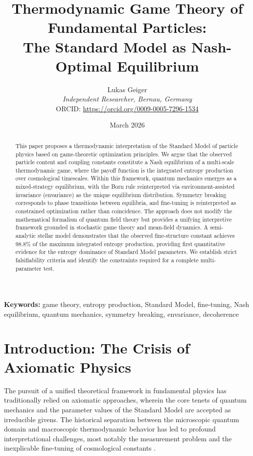 \documentclass[12pt,a4paper]{article}
\title{Thermodynamic Game Theory of Fundamental Particles:\\
The Standard Model as Nash-Optimal Equilibrium}
\author{Lukas Geiger\\
\textit{Independent Researcher, Bernau, Germany}\\
ORCID: \url{https://orcid.org/0009-0005-7296-1534}}
\date{March 2026}
\theoremstyle{remark}
\begin{document}
\maketitle

\begin{abstract}
This paper proposes a thermodynamic interpretation of the Standard Model of particle physics based on game-theoretic optimization principles. We argue that the observed particle content and coupling constants constitute a Nash equilibrium of a multi-scale thermodynamic game, where the payoff function is the integrated entropy production over cosmological timescales. Within this framework, quantum mechanics emerges as a mixed-strategy equilibrium, with the Born rule reinterpreted via environment-assisted invariance (envariance) as the unique equilibrium distribution. Symmetry breaking corresponds to phase transitions between equilibria, and fine-tuning is reinterpreted as constrained optimization rather than coincidence. The approach does not modify the mathematical formalism of quantum field theory but provides a unifying interpretive framework grounded in stochastic game theory and mean-field dynamics. A semi-analytic stellar model demonstrates that the observed fine-structure constant achieves 98.8\% of the maximum integrated entropy production, providing first quantitative evidence for the entropy dominance of Standard Model parameters. We establish strict falsifiability criteria and identify the constraints required for a complete multi-parameter test.
\end{abstract}

\textbf{Keywords:} game theory, entropy production, Standard Model, fine-tuning, Nash equilibrium, quantum mechanics, symmetry breaking, envariance, decoherence

\section{Introduction: The Crisis of Axiomatic Physics}
\label{sec:introduction}

The pursuit of a unified theoretical framework in fundamental physics has traditionally relied on axiomatic approaches, wherein the core tenets of quantum mechanics and the parameter values of the Standard Model are accepted as irreducible givens. The historical separation between the microscopic quantum domain and macroscopic thermodynamic behavior has led to profound interpretational challenges, most notably the measurement problem and the inexplicable fine-tuning of cosmological constants \citep{Adams2019}.
\end{document}
